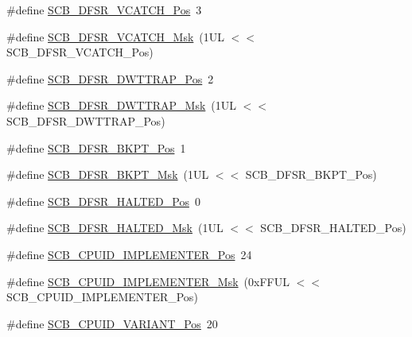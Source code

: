 \begin{DoxyCompactItemize}
\item 
\#define \mbox{\hyperlink{group___c_m_s_i_s___s_c_b_gad02d3eaf062ac184c18a7889c9b6de57}{S\+C\+B\+\_\+\+D\+F\+S\+R\+\_\+\+V\+C\+A\+T\+C\+H\+\_\+\+Pos}}~3
\item 
\#define \mbox{\hyperlink{group___c_m_s_i_s___s_c_b_gacbb931575c07b324ec793775b7c44d05}{S\+C\+B\+\_\+\+D\+F\+S\+R\+\_\+\+V\+C\+A\+T\+C\+H\+\_\+\+Msk}}~(1\+U\+L $<$$<$ S\+C\+B\+\_\+\+D\+F\+S\+R\+\_\+\+V\+C\+A\+T\+C\+H\+\_\+\+Pos)
\item 
\#define \mbox{\hyperlink{group___c_m_s_i_s___s_c_b_gaccf82364c6d0ed7206f1084277b7cc61}{S\+C\+B\+\_\+\+D\+F\+S\+R\+\_\+\+D\+W\+T\+T\+R\+A\+P\+\_\+\+Pos}}~2
\item 
\#define \mbox{\hyperlink{group___c_m_s_i_s___s_c_b_ga3f7384b8a761704655fd45396a305663}{S\+C\+B\+\_\+\+D\+F\+S\+R\+\_\+\+D\+W\+T\+T\+R\+A\+P\+\_\+\+Msk}}~(1\+U\+L $<$$<$ S\+C\+B\+\_\+\+D\+F\+S\+R\+\_\+\+D\+W\+T\+T\+R\+A\+P\+\_\+\+Pos)
\item 
\#define \mbox{\hyperlink{group___c_m_s_i_s___s_c_b_gaf28fdce48655f0dcefb383aebf26b050}{S\+C\+B\+\_\+\+D\+F\+S\+R\+\_\+\+B\+K\+P\+T\+\_\+\+Pos}}~1
\item 
\#define \mbox{\hyperlink{group___c_m_s_i_s___s_c_b_ga609edf8f50bc49adb51ae28bcecefe1f}{S\+C\+B\+\_\+\+D\+F\+S\+R\+\_\+\+B\+K\+P\+T\+\_\+\+Msk}}~(1\+U\+L $<$$<$ S\+C\+B\+\_\+\+D\+F\+S\+R\+\_\+\+B\+K\+P\+T\+\_\+\+Pos)
\item 
\#define \mbox{\hyperlink{group___c_m_s_i_s___s_c_b_gaef4ec28427f9f88ac70a13ae4e541378}{S\+C\+B\+\_\+\+D\+F\+S\+R\+\_\+\+H\+A\+L\+T\+E\+D\+\_\+\+Pos}}~0
\item 
\#define \mbox{\hyperlink{group___c_m_s_i_s___s_c_b_ga200bcf918d57443b5e29e8ce552e4bdf}{S\+C\+B\+\_\+\+D\+F\+S\+R\+\_\+\+H\+A\+L\+T\+E\+D\+\_\+\+Msk}}~(1\+U\+L $<$$<$ S\+C\+B\+\_\+\+D\+F\+S\+R\+\_\+\+H\+A\+L\+T\+E\+D\+\_\+\+Pos)
\item 
\#define \mbox{\hyperlink{group___c_m_s_i_s___s_c_b_ga58686b88f94f789d4e6f429fe1ff58cf}{S\+C\+B\+\_\+\+C\+P\+U\+I\+D\+\_\+\+I\+M\+P\+L\+E\+M\+E\+N\+T\+E\+R\+\_\+\+Pos}}~24
\item 
\#define \mbox{\hyperlink{group___c_m_s_i_s___s_c_b_ga0932b31faafd47656a03ced75a31d99b}{S\+C\+B\+\_\+\+C\+P\+U\+I\+D\+\_\+\+I\+M\+P\+L\+E\+M\+E\+N\+T\+E\+R\+\_\+\+Msk}}~(0x\+F\+F\+U\+L $<$$<$ S\+C\+B\+\_\+\+C\+P\+U\+I\+D\+\_\+\+I\+M\+P\+L\+E\+M\+E\+N\+T\+E\+R\+\_\+\+Pos)
\item 
\#define \mbox{\hyperlink{group___c_m_s_i_s___s_c_b_ga104462bd0815391b4044a70bd15d3a71}{S\+C\+B\+\_\+\+C\+P\+U\+I\+D\+\_\+\+V\+A\+R\+I\+A\+N\+T\+\_\+\+Pos}}~20
$$
\end{DoxyCompactItemize}
